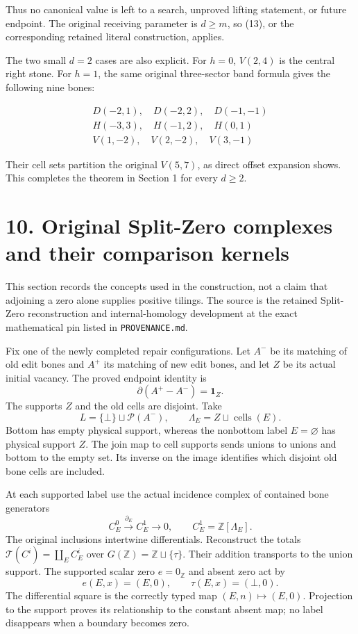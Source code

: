 \documentclass[
  11pt,
]{article}
\begin{document}
Thus no canonical value is left to a search, unproved lifting statement,
or future endpoint. The original receiving parameter is \(d\ge m\), so
(13), or the corresponding retained literal construction, applies.

The two small \(d=2\) cases are also explicit. For \(h=0\), \(V(2,4)\)
is the central right stone. For \(h=1\), the same original three-sector
band formula gives the following nine bones:

\[
\begin{gathered}
D(-2,1),\quad D(-2,2),\quad D(-1,-1)\\
H(-3,3),\quad H(-1,2),\quad H(0,1)\\
V(1,-2),\quad V(2,-2),\quad V(3,-1)
\end{gathered}
\]

Their cell sets partition the original \(V(5,7)\), as direct offset
expansion shows. This completes the theorem in Section 1 for every
\(d\ge2\).

\section{10. Original Split-Zero complexes and their comparison
kernels}\label{original-split-zero-complexes-and-their-comparison-kernels}

This section records the concepts used in the construction, not a claim
that adjoining a zero alone supplies positive tilings. The source is the
retained Split-Zero reconstruction and internal-homology development at
the exact mathematical pin listed in \texttt{PROVENANCE.md}.

Fix one of the newly completed repair configurations. Let \(A^-\) be its
matching of old edit bones and \(A^+\) its matching of new edit bones,
and let \(Z\) be its actual initial vacancy. The proved endpoint
identity is \[
 \partial(A^+-A^-)=\mathbf1_Z.                            \tag{15}
\] The supports \(Z\) and the old cells are disjoint. Take \[
 L=\{\bot\}\sqcup\mathcal P(A^-),\qquad
 \Lambda_E=Z\sqcup\operatorname{cells}(E).
\] Bottom has empty physical support, whereas the nonbottom label
\(E=\varnothing\) has physical support \(Z\). The join map to cell
supports sends unions to unions and bottom to the empty set. Its inverse
on the image identifies which disjoint old bone cells are included.

At each supported label use the actual incidence complex of contained
bone generators \[
 C_E^0\xrightarrow{\partial_E}C_E^1\longrightarrow0,
 \qquad C_E^1=\mathbb Z[\Lambda_E].
\] The original inclusions intertwine differentials. Reconstruct the
totals \(\mathcal T(C^i)=\coprod_E C_E^i\) over
\(G(\mathbb Z)=\mathbb Z\sqcup\{\tau\}\). Their addition transports to
the union support. The supported scalar zero \(e=0_{\mathbb Z}\) and
absent zero act by \[
 e(E,x)=(E,0),\qquad \tau(E,x)=(\bot,0).
\] The differential square is the correctly typed map
\((E,n)\mapsto(E,0)\). Projection to the support proves its relationship
to the constant absent map; no label disappears when a boundary becomes
zero.
\end{document}
